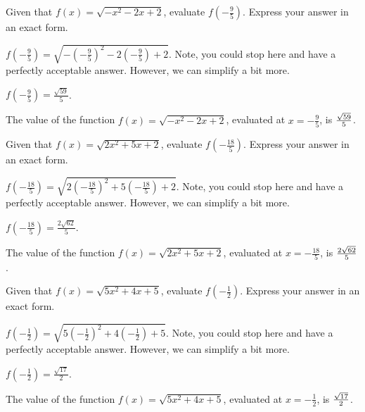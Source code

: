 \begin{shuffle}
\begin{exercise}
Given that $f(x)=\sqrt{-x^2-2 x+2}$, evaluate $f\left(-\frac{9}{5}\right)$. Express your answer in an exact form.
\begin{solution}
\begin{hint}
$f\left(-\frac{9}{5}\right)=\sqrt{-(-\frac{9}{5})^2-2 (-\frac{9}{5})+2}$. Note, you could stop here and have a perfectly acceptable answer. However, we can simplify a bit more. 
\end{hint}
\begin{hint}
$f\left(-\frac{9}{5}\right)=\frac{\sqrt{59}}{5}$.
\end{hint}
The value of the function $f(x) = \sqrt{-x^2-2 x+2}$, evaluated at $x=-\frac{9}{5}$, is ${\frac{\sqrt{59}}{5}}$.
\end{solution}
\end{exercise}

\begin{exercise}
Given that $f(x)=\sqrt{2 x^2+5 x+2}$, evaluate $f\left(-\frac{18}{5}\right)$. Express your answer in an exact form.
\begin{solution}
\begin{hint}
$f\left(-\frac{18}{5}\right)=\sqrt{2 (-\frac{18}{5})^2+5 (-\frac{18}{5})+2}$. Note, you could stop here and have a perfectly acceptable answer. However, we can simplify a bit more. 
\end{hint}
\begin{hint}
$f\left(-\frac{18}{5}\right)=\frac{2 \sqrt{62}}{5}$.
\end{hint}
The value of the function $f(x) = \sqrt{2 x^2+5 x+2}$, evaluated at $x=-\frac{18}{5}$, is ${\frac{2 \sqrt{62}}{5}}$.
\end{solution}
\end{exercise}

\begin{exercise}
Given that $f(x)=\sqrt{5 x^2+4 x+5}$, evaluate $f\left(-\frac{1}{2}\right)$. Express your answer in an exact form.
\begin{solution}
\begin{hint}
$f\left(-\frac{1}{2}\right)=\sqrt{5 (-\frac{1}{2})^2+4 (-\frac{1}{2})+5}$. Note, you could stop here and have a perfectly acceptable answer. However, we can simplify a bit more. 
\end{hint}
\begin{hint}
$f\left(-\frac{1}{2}\right)=\frac{\sqrt{17}}{2}$.
\end{hint}
The value of the function $f(x) = \sqrt{5 x^2+4 x+5}$, evaluated at $x=-\frac{1}{2}$, is ${\frac{\sqrt{17}}{2}}$.
\end{solution}
\end{exercise}


\end{shuffle}
